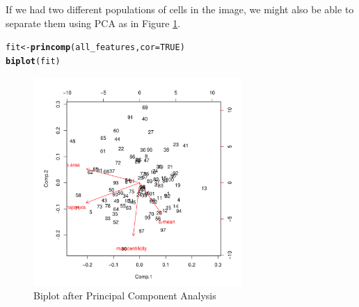 \documentclass{article}\usepackage[]{graphicx}\usepackage[]{color}
\makeatletter
\newcommand{\hlnum}[1]{\textcolor[rgb]{0.686,0.059,0.569}{#1}}%
\newcommand{\hlstd}[1]{\textcolor[rgb]{0.345,0.345,0.345}{#1}}%
\newcommand{\hlkwb}[1]{\textcolor[rgb]{0.69,0.353,0.396}{#1}}%
\newcommand{\hlkwc}[1]{\textcolor[rgb]{0.333,0.667,0.333}{#1}}%
\newcommand{\hlkwd}[1]{\textcolor[rgb]{0.737,0.353,0.396}{\textbf{#1}}}%
\newenvironment{kframe}{%
 \def\at@end@of@kframe{}%
 \ifinner\ifhmode%
  \def\at@end@of@kframe{\end{minipage}}%
  \begin{minipage}{\columnwidth}%
 \fi\fi%
 \def\FrameCommand##1{\hskip\@totalleftmargin \hskip-\fboxsep
 \colorbox{shadecolor}{##1}\hskip-\fboxsep
     \hskip-\linewidth \hskip-\@totalleftmargin \hskip\columnwidth}%
 \MakeFramed {\advance\hsize-\width
   \@totalleftmargin\z@ \linewidth\hsize
   \@setminipage}}%
 {\par\unskip\endMakeFramed%
 \at@end@of@kframe}
\newenvironment{knitrout}{}{} %
\makeatother
\begin{document}
If we had two different populations of cells in the image, we might also be able to separate them using PCA as in Figure \ref{fig:pca}.
\begin{knitrout}
\color{fgcolor}\begin{kframe}
\begin{alltt}
\hlstd{fit} \hlkwb{<-} \hlkwd{princomp}\hlstd{(all_features,} \hlkwc{cor} \hlstd{=} \hlnum{TRUE}\hlstd{)}
\hlkwd{biplot}\hlstd{(fit)}
\end{alltt}
\end{kframe}\begin{figure}[]


{\centering \includegraphics[width=300px]{knit_figure/figpca} 

}

\caption[Biplot after Principal Component Analysis]{Biplot after Principal Component Analysis\label{fig:pca}}
\end{figure}


\end{knitrout}
\end{document}
